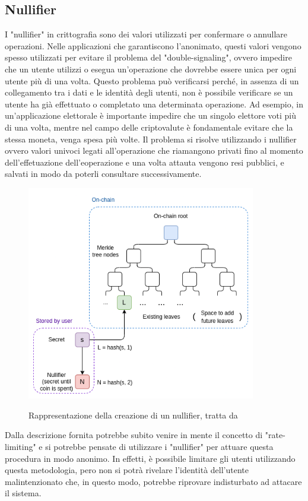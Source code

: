 \subsection{Nullifier}
I "nullifier" in crittografia sono dei valori utilizzati per confermare o annullare operazioni. Nelle applicazioni che garantiscono
l'anonimato, questi valori vengono spesso utilizzati per evitare il problema del "double-signaling", ovvero impedire che
un utente utilizzi o esegua un'operazione che dovrebbe essere unica per ogni utente più di una volta. Questo problema
può verificarsi perché, in assenza di un collegamento tra i dati e le identità degli utenti, non è possibile verificare
se un utente ha già effettuato o completato una determinata operazione. Ad esempio, in un'applicazione elettorale è
importante impedire che un singolo elettore voti più di una volta, mentre nel campo delle criptovalute è fondamentale evitare che la
stessa moneta, venga spesa più volte. Il problema si risolve utilizzando i nullifier ovvero valori univoci legati
all'operazione che riamangono privati fino al momento dell'effetuazione dell'eoperazione e una volta attauta vengono
resi pubblici, e salvati in modo da poterli consultare successivamente.
\begin{figure}[H]
    \centering
    \includegraphics[width=10cm]{./chapters/2.rln-protocol/images/4.nullifier.png}
    \label{fig:nullifier}
    \captionsetup{justification=centering}
    \caption{Rappresentazione della creazione di un nullifier, tratta da \cite{some-ways-to-use-zk-snarks-for-privacy}}
\end{figure}
Dalla descrizione fornita potrebbe subito venire in mente il concetto di "rate-limiting" e si potrebbe pensate di
utilizzare i "nullifier" per attuare questa procedura in modo anonimo. In effetti, è possibile limitare gli
utenti utilizzando questa metodologia, pero non si potrà rivelare l'identità dell'utente malintenzionato che, in questo
modo, potrebbe riprovare indisturbato ad attacare il sistema.